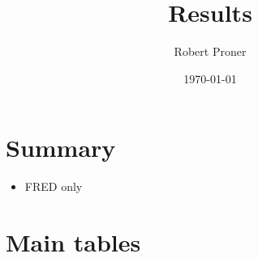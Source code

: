 \documentclass[11pt,a4paper]{article}
\title{Results}
\date{\today}
\author{Robert Proner}
\newcommand{\resultsdate}{2026-06-26}
\begin{document}

\maketitle

\section{Summary}
\begin{itemize}
  \item FRED only
\end{itemize}

\section{Main tables}

\begin{table}[htbp]
  \centering
  \resizebox{\textwidth}{!}{
  
  }
  \caption{$R^1$ table for annual inflation, annual IP growth, and annual percent change in the unemployment rate for the period January 1998 to December 2024}
  \label{tab: baseline r1 table}
\end{table}


%     

%     
\end{document}
